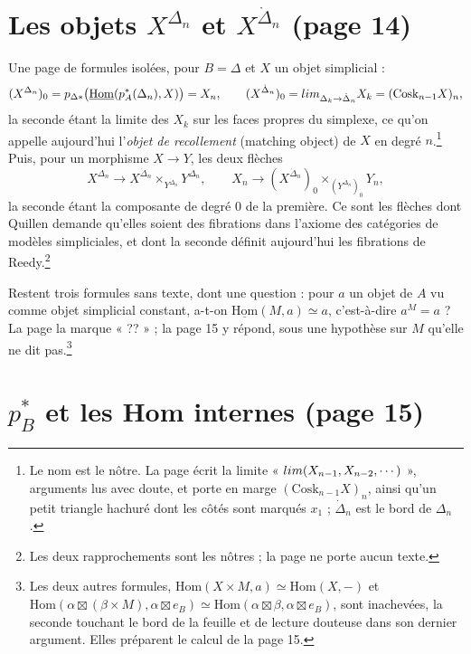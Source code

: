 \documentclass[11pt,a4paper]{article}
\begin{document}
\section*{Les objets $X^{\Delta_{n}}$ et $X^{\dot{\Delta}_{n}}$ (page 14)}

Une page de formules isolées, pour $B = \Delta$ et $X$ un objet simplicial :
\[
(X^{\Delta_{n}})_{0} = p_{\Delta*}\bigl(\underline{\mathrm{Hom}}(p_{A}^{*}(\Delta_{n}),
X)\bigr) = X_{n}, \qquad
(X^{\dot{\Delta}_{n}})_{0} = \varprojlim_{\Delta_{k} \to \dot{\Delta}_{n}} X_{k}
= (\mathrm{Cosk}_{n-1} X)_{n},
\]
la seconde étant la limite des $X_{k}$ sur les faces propres du simplexe,
ce qu'on appelle aujourd'hui l'\emph{objet de recollement} (matching object)
de $X$ en degré $n$.\footnote{Le nom est le nôtre. La page écrit la limite
« $\varprojlim(X_{n-1}, X_{n-2}, \cdots)$ », arguments lus avec doute, et
porte en marge $(\mathrm{Cosk}_{n-1}X)_{n}$, ainsi qu'un petit triangle
hachuré dont les côtés sont marqués $x_{1}$ ; $\dot{\Delta}_{n}$ est le bord
de $\Delta_{n}$.} Puis, pour un morphisme $X \to Y$, les deux flèches
\[
X^{\Delta_{n}} \longrightarrow X^{\dot{\Delta}_{n}}
\times_{Y^{\dot{\Delta}_{n}}} Y^{\Delta_{n}}, \qquad
X_{n} \longrightarrow (X^{\dot{\Delta}_{n}})_{0}
\times_{(Y^{\dot{\Delta}_{n}})_{0}} Y_{n},
\]
la seconde étant la composante de degré $0$ de la première. Ce sont les
flèches dont Quillen demande qu'elles soient des fibrations dans l'axiome
des catégories de modèles simpliciales, et dont la seconde définit
aujourd'hui les fibrations de Reedy.\footnote{Les deux rapprochements sont les
nôtres ; la page ne porte aucun texte.}

Restent trois formules sans texte, dont une question : pour $a$ un objet de
$A$ vu comme objet simplicial constant, a-t-on $\underline{\mathrm{Hom}}(M, a)
\simeq a$, c'est-à-dire $a^{M} = a$ ? La page la marque « ?? » ; la page 15
y répond, sous une hypothèse sur $M$ qu'elle ne dit pas.\footnote{Les deux
autres formules, $\mathrm{Hom}(X \times M, a) \simeq \mathrm{Hom}(X, -)$ et
$\mathrm{Hom}(\alpha \boxtimes (\beta \times M), \alpha \boxtimes e_{B}) \simeq
\mathrm{Hom}(\alpha \boxtimes \beta, \alpha \boxtimes e_{B})$, sont
inachevées, la seconde touchant le bord de la feuille et de lecture douteuse
dans son dernier argument. Elles préparent le calcul de la page 15.}

\section*{$p_{B}^{*}$ et les Hom internes (page 15)}
\end{document}
